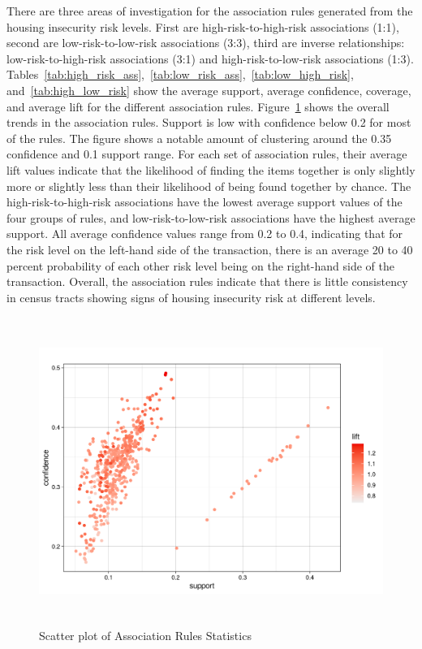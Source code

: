 There are three areas of investigation for the association rules generated from the housing insecurity risk levels. First are high-risk-to-high-risk associations (1:1), second are low-risk-to-low-risk associations (3:3), third are inverse relationships: low-risk-to-high-risk associations (3:1) and high-risk-to-low-risk associations (1:3). Tables~\ref{tab:high_risk_ass},~\ref{tab:low_risk_ass},~\ref{tab:low_high_risk}, and~\ref{tab:high_low_risk} show the average support, average confidence, coverage, and average lift for the different association rules. Figure~\ref{fig:assoc_scatter} shows the overall trends in the association rules. Support is low with confidence below 0.2 for most of the rules.  The figure shows a notable amount of clustering around the 0.35 confidence and 0.1 support range. For each set of association rules, their average lift values indicate that the likelihood of finding the items together is only slightly more or slightly less than their likelihood of being found together by chance. The high-risk-to-high-risk associations have the lowest average support values of the four groups of rules, and low-risk-to-low-risk associations have the highest average support. All average confidence values range from 0.2 to 0.4, indicating that for the risk level on the left-hand side of the transaction, there is an average 20 to 40 percent probability of each other risk level being on the right-hand side of the transaction. Overall, the association rules indicate that there is little consistency in census tracts showing signs of housing insecurity risk at different levels. 


 \begin{figure}[htbp]
    \centering
     \includegraphics[width=1\textwidth, height=10cm]{plots/assoc_scatter.png}
     \caption{Scatter plot of Association Rules Statistics}
     \label{fig:assoc_scatter} %
 \end{figure}


